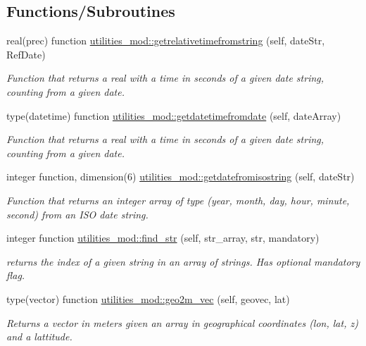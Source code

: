 \subsection*{Functions/\+Subroutines}
\begin{DoxyCompactItemize}
\item 
real(prec) function \mbox{\hyperlink{namespaceutilities__mod_a0dea0f7cb05b1a7c7c1da1d85a416b37}{utilities\+\_\+mod\+::getrelativetimefromstring}} (self, date\+Str, Ref\+Date)
\begin{DoxyCompactList}\small\item\em Function that returns a real with a time in seconds of a given date string, counting from a given date. \end{DoxyCompactList}\item 
type(datetime) function \mbox{\hyperlink{namespaceutilities__mod_a83ed7b458b5b642544fd59ce7473eb0c}{utilities\+\_\+mod\+::getdatetimefromdate}} (self, date\+Array)
\begin{DoxyCompactList}\small\item\em Function that returns a real with a time in seconds of a given date string, counting from a given date. \end{DoxyCompactList}\item 
integer function, dimension(6) \mbox{\hyperlink{namespaceutilities__mod_ab5b97f243f9347a40db76d55509d37ca}{utilities\+\_\+mod\+::getdatefromisostring}} (self, date\+Str)
\begin{DoxyCompactList}\small\item\em Function that returns an integer array of type (year, month, day, hour, minute, second) from an I\+SO date string. \end{DoxyCompactList}\item 
integer function \mbox{\hyperlink{namespaceutilities__mod_ad446cce78a6509db0e839439a0e84564}{utilities\+\_\+mod\+::find\+\_\+str}} (self, str\+\_\+array, str, mandatory)
\begin{DoxyCompactList}\small\item\em returns the index of a given string in an array of strings. Has optional mandatory flag. \end{DoxyCompactList}\item 
type(vector) function \mbox{\hyperlink{namespaceutilities__mod_a3d3d0e1568b178cd3e0bb8013642946c}{utilities\+\_\+mod\+::geo2m\+\_\+vec}} (self, geovec, lat)
\begin{DoxyCompactList}\small\item\em Returns a vector in meters given an array in geographical coordinates (lon, lat, z) and a lattitude. \end{DoxyCompactList}\item 

\end{DoxyCompactItemize}
